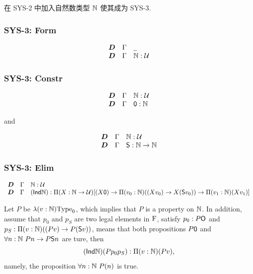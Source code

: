 在 SYS-2 中加入自然数类型 $\mathbb{N}$ 使其成为 SYS-3.


\subsubsection*{SYS-3: Form}

\[
  \begin{array}{lll}
    \boldsymbol{D} & \Gamma & \mathord{\underline{\hspace{0.5em}}}
    \\ 
    \boldsymbol{D} & \Gamma & \mathbb{N} : \mathcal{U} 
  \end{array}
\]




\subsubsection*{SYS-3: Constr}

\[
  \begin{array}{lll}
    \boldsymbol{D} & \Gamma & \mathbb{N} : \mathcal{U}
    \\ 
    \boldsymbol{D} & \Gamma & \text{{\sffamily 0}} : \mathbb{N} 
  \end{array}
\]

and 


\[
  \begin{array}{lll}
    \boldsymbol{D} & \Gamma & \mathbb{N} : \mathcal{U}
    \\ 
    \boldsymbol{D} & \Gamma & \text{{\sffamily S}} : \mathbb{N} \rightarrow \mathbb{N}
  \end{array}
\]


\subsubsection*{SYS-3: Elim}

\[
  \begin{array}{lll}
    \boldsymbol{D} & \Gamma & \mathbb{N} : \mathcal{U}
    \\ 
    \boldsymbol{D} & \Gamma & (\text{{\sffamily Ind}} \mathbb{N}) : \Pi (X : \mathbb{N} \rightarrow \mathcal{U}) [ (X \text{{\sffamily 0}}) \rightarrow \Pi(v_0 : \mathbb{N})((X v_0) \rightarrow X (\text{{\sffamily S}} v_0)) \rightarrow \Pi(v_1 : \mathbb{N}) (X v_1) ]  
  \end{array}
\]

\begin{example}
  Let $P$ be $\lambda (v: \mathbb{N}) \mathrm{Type}_0$, which implies that $P$ is a property on $\mathbb{N}$. In addition, assume that $p_0$ and $p_S$ are two legal elements in $\mathrm{F}$, satisfy $p_0 : P \text{{\sffamily O}}$ and $p_S : \Pi(v : \mathbb{N})((P v) \rightarrow P (\text{{\sffamily S}} v))$, means that both propositions $ P \text{{\sffamily 0}}$ and $\forall n : \mathbb{N} \ P n \rightarrow P \text{{\sffamily S}} n$ are ture, then
  \[
    (\text{{\sffamily Ind}}\mathbb{N})(P p_0 p_S) : \Pi (v : \mathbb{N})(P v),
  \]
  namely, the proposition $\forall n : \mathbb{N} \ P (n)$ is true.
\end{example}




